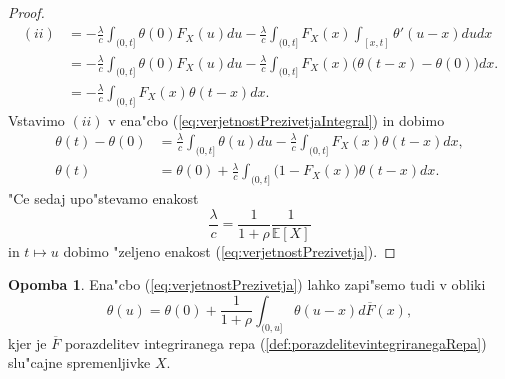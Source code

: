 \documentclass[12pt, a4paper, reqno]{amsart}
\theoremstyle{definition}
\newtheorem{opomba}[definicija]{Opomba}
\theoremstyle{plain}
\newcommand{\E}{\mathbb{E}}
\newcommand{\1}{\mathds{1}}
\begin{document}
\begin{proof}
                \begin{align*}
                    (ii)    &=  - \frac{\lambda}{c}\int_{(0, t]}\theta(0)F_X(u)du - \frac{\lambda}{c}\int_{(0, t]}F_X(x)\int_{[x, t]}\theta'(u - x)dudx \\
                            &= - \frac{\lambda}{c}\int_{(0, t]}\theta(0)F_X(u)du - \frac{\lambda}{c}\int_{(0, t]}F_X(x)\bigl(\theta(t-x) - \theta(0)\bigr)dx.\\
                            &= - \frac{\lambda}{c}\int_{(0, t]}F_X(x)\theta(t - x)dx.
                \end{align*}
                Vstavimo $(ii)$ v ena"cbo (\ref{eq:verjetnostPrezivetjaIntegral}) in dobimo
                \begin{align*}
                    \theta(t) - \theta(0) &= \frac{\lambda}{c}\int_{(0, t]}\theta(u)du - \frac{\lambda}{c}\int_{(0, t]}F_X(x)\theta(t - x)dx,\\
                    \theta(t) &= \theta(0) + \frac{\lambda}{c}\int_{(0, t]}\bigl(1 - F_X(x)\bigr)\theta(t - x)dx.
                \end{align*}
                "Ce sedaj upo"stevamo enakost 
                \begin{equation*}
                    \frac{\lambda}{c} = \frac{1}{1 + \rho}\frac{1}{\E\left[X\right]}
                \end{equation*}
                in $t\mapsto u$ dobimo "zeljeno enakost (\ref{eq:verjetnostPrezivetja}).

            \end{proof}

            \begin{opomba}
                    Ena"cbo (\ref{eq:verjetnostPrezivetja}) lahko zapi"semo tudi v obliki 
                    \begin{equation}
                        \theta(u) = \theta(0) + \frac{1}{1+\rho}\int_{(0, u]}\theta(u - x)d\overline{F}(x),
                        \label{eq:verjetnostPrezivetja2}
                    \end{equation}
                    kjer je $\overline{F}$ porazdelitev integriranega repa (\ref{def:porazdelitevintegriranegaRepa}) 
                    slu"cajne spremenljivke $X$.
                \label{op:verjetnostPrezivetja1}
            \end{opomba}
\end{document}
